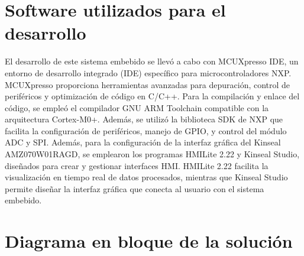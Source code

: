 \section{Software utilizados para el desarrollo}
El desarrollo de este sistema embebido se llevó a cabo con MCUXpresso IDE, un entorno de desarrollo integrado (IDE) específico para microcontroladores NXP. MCUXpresso proporciona herramientas avanzadas para depuración, control de periféricos y optimización de código en C/C++. Para la compilación y enlace del código, se empleó el compilador GNU ARM Toolchain compatible con la arquitectura Cortex-M0+. Además, se utilizó la biblioteca SDK de NXP que facilita la configuración de periféricos, manejo de GPIO, y control del módulo ADC y SPI. Además, para la configuración de la interfaz gráfica del Kinseal AMZ070W01RAGD, se emplearon los programas HMILite 2.22 y Kinseal Studio, diseñados para crear y gestionar interfaces HMI. HMILite 2.22 facilita la visualización en tiempo real de datos procesados, mientras que Kinseal Studio permite diseñar la interfaz gráfica que conecta al usuario con el sistema embebido.

\section{Diagrama en bloque de la solución}

